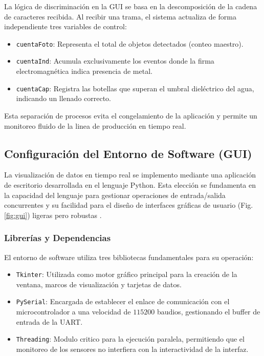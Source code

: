 \documentclass[conference]{IEEEtran}
\begin{document}
La lógica de discriminación en la GUI se basa en la descomposición de la cadena de caracteres recibida. Al recibir una trama, el sistema actualiza de forma independiente tres variables de control:
\begin{itemize}
    \item \texttt{cuentaFoto}: Representa el total de objetos detectados (conteo maestro).
    \item \texttt{cuentaInd}: Acumula exclusivamente los eventos donde la firma electromagnética indica presencia de metal.
    \item \texttt{cuentaCap}: Registra las botellas que superan el umbral dieléctrico del agua, indicando un llenado correcto.
\end{itemize}
Esta separación de procesos evita el congelamiento de la aplicación y permite un monitoreo fluido de la linea de producción en tiempo real.

\subsection{Configuración del Entorno de Software (GUI)}

La visualización de datos en tiempo real se implemento mediante una aplicación de escritorio desarrollada en el lenguaje Python. Esta elección se fundamenta en la capacidad del lenguaje para gestionar operaciones de entrada/salida concurrentes y su facilidad para el diseño de interfaces gráficas de usuario (Fig. \ref{fig:gui}) ligeras pero robustas \cite{sensores_14}.

\subsubsection{Librerías y Dependencias}
El entorno de software utiliza tres bibliotecas fundamentales para su operación:
\begin{itemize}
    \item \texttt{Tkinter}: Utilizada como motor gráfico principal para la creación de la ventana, marcos de visualización y tarjetas de datos.
    \item \texttt{PySerial}: Encargada de establecer el enlace de comunicación con el microcontrolador a una velocidad de $115200$ baudios, gestionando el buffer de entrada de la UART.
    \item \texttt{Threading}: Modulo critico para la ejecución paralela, permitiendo que el monitoreo de los sensores no interfiera con la interactividad de la interfaz.
\end{itemize}
\end{document}
